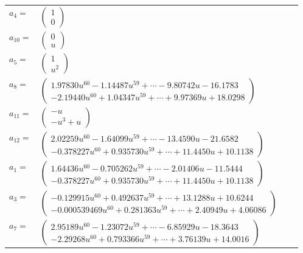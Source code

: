 \documentclass[1p]{elsarticle_modified}
\theoremstyle{definition}
\begin{document}
\begin{tabular}{m{7pt} m{180pt} m{7pt} m{180pt} }
\flushright $a_{4}=$&$\begin{pmatrix}1\\0\end{pmatrix}$ \\
\flushright $a_{10}=$&$\begin{pmatrix}0\\u\end{pmatrix}$ \\
\flushright $a_{5}=$&$\begin{pmatrix}1\\u^2\end{pmatrix}$ \\
\flushright $a_{8}=$&$\begin{pmatrix}1.97830 u^{60}-1.14487 u^{59}+\cdots-9.80742 u-16.1783\\-2.19440 u^{60}+1.04347 u^{59}+\cdots+9.97369 u+18.0298\end{pmatrix}$ \\
\flushright $a_{11}=$&$\begin{pmatrix}- u\\- u^3+u\end{pmatrix}$ \\
\flushright $a_{12}=$&$\begin{pmatrix}2.02259 u^{60}-1.64099 u^{59}+\cdots-13.4590 u-21.6582\\-0.378227 u^{60}+0.935730 u^{59}+\cdots+11.4450 u+10.1138\end{pmatrix}$ \\
\flushright $a_{1}=$&$\begin{pmatrix}1.64436 u^{60}-0.705262 u^{59}+\cdots-2.01406 u-11.5444\\-0.378227 u^{60}+0.935730 u^{59}+\cdots+11.4450 u+10.1138\end{pmatrix}$ \\
\flushright $a_{3}=$&$\begin{pmatrix}-0.129915 u^{60}+0.492637 u^{59}+\cdots+13.1288 u+10.6244\\-0.000539469 u^{60}+0.281363 u^{59}+\cdots+2.40949 u+4.06086\end{pmatrix}$ \\
\flushright $a_{7}=$&$\begin{pmatrix}2.95189 u^{60}-1.23072 u^{59}+\cdots-6.85929 u-18.3643\\-2.29268 u^{60}+0.793366 u^{59}+\cdots+3.76139 u+14.0016\end{pmatrix}$ \\

\end{tabular}
\end{document}
